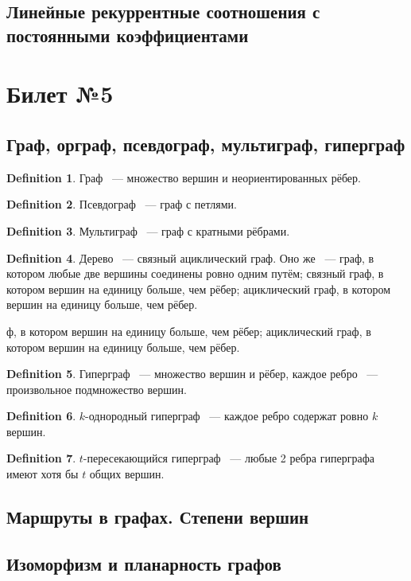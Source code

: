 \documentclass[a4paper]{article}
\theoremstyle{plain}
\theoremstyle{remark}
\theoremstyle{definition}
\newtheorem*{definition-star}{Definition}
\begin{document}
\subsection{Линейные рекуррентные соотношения с постоянными коэффициентами}

\section{Билет №5}
\subsection{Граф, орграф, псевдограф, мультиграф, гиперграф}
\begin{definition-star} Граф ~--- множество вершин и неориентированных рёбер.
\end{definition-star}
\begin{definition-star} Псевдограф ~--- граф с петлями.
\end{definition-star}
\begin{definition-star} Мультиграф ~--- граф с кратными рёбрами.
\end{definition-star}
\begin{definition-star} Дерево ~--- связный ациклический граф. Оно же ~--- граф, в котором любые две вершины соединены ровно одним путём; связный граф, в котором вершин на единицу больше, чем рёбер; ациклический граф,  в котором вершин на единицу больше, чем рёбер.
\end{definition-star}ф, в котором вершин на единицу больше, чем рёбер; ациклический граф,  в котором вершин на единицу больше, чем рёбер.
\begin{definition-star} Гиперграф ~--- множество вершин и рёбер,  каждое ребро ~--- произвольное подмножество вершин.
\end{definition-star}
\begin{definition-star} $k$-однородный гиперграф ~--- каждое ребро содержат ровно $k$ вершин.
\end{definition-star}
\begin{definition-star} $t$-пересекающийся гиперграф ~--- любые 2 ребра гиперграфа имеют хотя бы $t$ общих вершин.
\end{definition-star}

\subsection{Маршруты в графах. Степени вершин}

\subsection{Изоморфизм и планарность графов}
\end{document}
